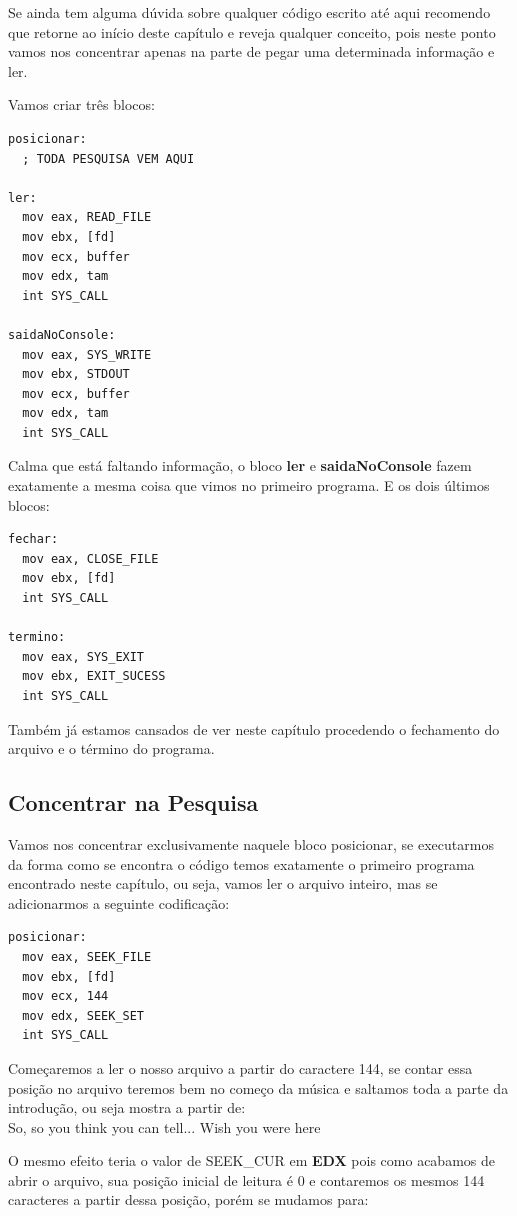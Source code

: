 Se ainda tem alguma dúvida sobre qualquer código escrito até aqui recomendo que retorne ao início deste capítulo e reveja qualquer conceito, pois neste ponto vamos nos concentrar apenas na parte de pegar uma determinada informação e ler.

Vamos criar três blocos:
\begin{lstlisting}[]
posicionar:
  ; TODA PESQUISA VEM AQUI

ler:
  mov eax, READ_FILE
  mov ebx, [fd]
  mov ecx, buffer
  mov edx, tam
  int SYS_CALL

saidaNoConsole:
  mov eax, SYS_WRITE
  mov ebx, STDOUT
  mov ecx, buffer
  mov edx, tam
  int SYS_CALL
\end{lstlisting}	

Calma que está faltando informação, o bloco \textbf{ler} e \textbf{saidaNoConsole} fazem exatamente a mesma coisa que vimos no primeiro programa. E os dois últimos blocos:
\begin{lstlisting}[]
fechar:
  mov eax, CLOSE_FILE
  mov ebx, [fd]
  int SYS_CALL

termino:
  mov eax, SYS_EXIT
  mov ebx, EXIT_SUCESS
  int SYS_CALL
\end{lstlisting}

Também já estamos cansados de ver neste capítulo procedendo o fechamento do arquivo e o término do programa.

\subsection{Concentrar na Pesquisa}
Vamos nos concentrar exclusivamente naquele bloco posicionar, se executarmos da forma como se encontra o código temos exatamente o primeiro programa encontrado neste capítulo, ou seja, vamos ler o arquivo inteiro, mas se adicionarmos a seguinte codificação:
\begin{lstlisting}[]
posicionar:
  mov eax, SEEK_FILE
  mov ebx, [fd]
  mov ecx, 144
  mov edx, SEEK_SET
  int SYS_CALL
\end{lstlisting}

Começaremos a ler o nosso arquivo a partir do caractere 144, se contar essa posição no arquivo teremos bem no começo da música e saltamos toda a parte da introdução, ou seja mostra a partir de: \\
{\ttfamily So, so you think you can tell... Wish you were here}

O mesmo efeito teria o valor de SEEK\_CUR em \textbf{EDX} pois como acabamos de abrir o arquivo, sua posição inicial de leitura é 0 e contaremos os mesmos 144 caracteres a partir dessa posição, porém se mudamos para:

